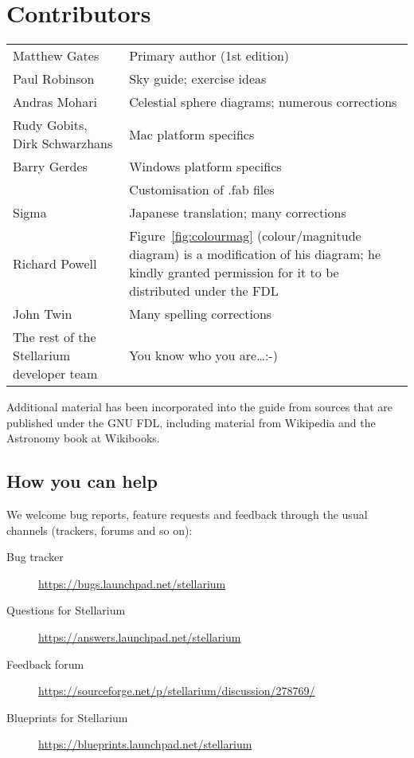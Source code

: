 
\chapter{Contributors}

\begin{longtabu} to \textwidth {l|X}
\toprule
Matthew Gates & Primary author (1st edition)\\
Paul Robinson &Sky guide; exercise ideas\\
Andras Mohari &Celestial sphere diagrams; numerous corrections\\
Rudy Gobits, Dirk Schwarzhans & Mac platform specifics\\
Barry Gerdes&Windows platform specifics \\
            &Customisation of .fab files\\
Sigma       &Japanese translation; many corrections\\ %
Richard Powell& Figure~\ref{fig:colourmag} (colour/magnitude diagram) is a modification of his diagram; he kindly granted permission for it to be distributed under the FDL\\
John Twin & Many spelling corrections \\
The rest of the Stellarium developer team & You know who you are\ldots :-)\tabularnewline
\bottomrule
\end{longtabu}


Additional material has been incorporated into the guide from sources
that are published under the GNU FDL, including material from Wikipedia
and the Astronomy book at Wikibooks.

\section{How you can help}
\label{sec:HowYouCanHelp}

We welcome bug reports, feature requests and feedback through the
usual channels (trackers, forums and so on):
\begin{description}
\item[Bug tracker] \url{https://bugs.launchpad.net/stellarium}
\item[Questions for Stellarium] \url{https://answers.launchpad.net/stellarium}
\item[Feedback forum] \url{https://sourceforge.net/p/stellarium/discussion/278769/}
\item[Blueprints for Stellarium] \url{https://blueprints.launchpad.net/stellarium}
\end{description}



